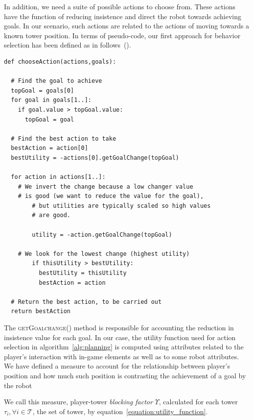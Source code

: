 In addition, we need a suite of possible actions to choose from. These actions have the function of reducing insistence and direct the robot towards achieving goals. In our scenario, such actions are related to the actions of moving towards a known tower position. In terms of pseudo-code, our first approach for behavior selection has been defined as in follows~(\cite{millington_artificial_2009}).

\begin{lstlisting}[caption=A basic~\gls{gob} algorithm for action selection.]
def chooseAction(actions,goals):

  # Find the goal to achieve    
  topGoal = goals[0]
  for goal in goals[1..]:
    if goal.value > topGoal.value:
      topGoal = goal
    	
  # Find the best action to take
  bestAction = action[0]
  bestUtility = -actions[0].getGoalChange(topGoal)

  for action in actions[1..]:
    # We invert the change because a low changer value 
    # is good (we want to reduce the value for the goal),
    	# but utilities are typically scaled so high values 
    	# are good.
    		
    	utility = -action.getGoalChange(topGoal)
    		
    # We look for the lowest change (highest utility)
    	if thisUtility > bestUtility:
    	  bestUtility = thisUtility 
    	  bestAction = action
    			
  # Return the best action, to be carried out
  return bestAction
\end{lstlisting}\label{alg:planning}

The \textsc{getGoalchange()} method is responsible for accounting the reduction in insistence value for each goal. In our case, the utility function used for action selection in algorithm~\ref{alg:planning} is computed using attributes related to the player's interaction with in-game elements as well as to some robot attributes. We have defined a measure to account for the relationship between player's position and how much such position is contrasting the achievement of a goal by the robot

We call this measure, player-tower \textit{blocking factor} $\Upsilon$, calculated for each tower  $\tau_{i},\forall i \in \mathcal{T}$, the set of tower, by equation~\ref{equation:utility_function}. 

